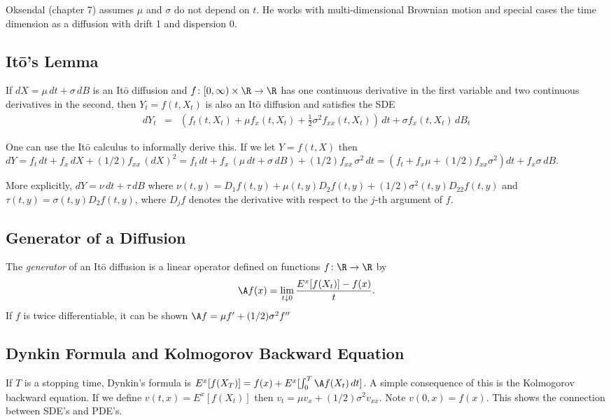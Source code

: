Oksendal (chapter 7) assumes $\mu$ and $\sigma$ do not depend on $t$.
He works with multi-dimensional Brownian motion and special
cases the time dimension as a diffusion with drift 1 and
dispersion 0.

\subsection{It\=o's Lemma}
If $dX = \mu\,dt + \sigma\,dB$ is an It\=o diffusion and
$f\colon [0,\infty)\times\R\to\R$ has one continuous
derivative in the first variable and two continuous derivatives
in the second, then
$Y_t = f(t, X_t)$ is also an It\=o diffusion and
satisfies the SDE
\begin{eqnarray*}
dY_t &=& 
	(f_t(t, X_t) + \mu f_x(t, X_t) + \frac{1}{2}\sigma^2 f_{xx}(t, X_t))\,dt + \sigma f_x(t, X_t)\,dB_t
\end{eqnarray*}

One can use the It\=o calculus to informally derive this.  If we let $Y =
f(t, X)$ then $dY = f_t\,dt +  f_x\,dX + (1/2)f_{xx}\,(dX)^2
= f_t\,dt +  f_x\,(\mu\,dt + \sigma\,dB) + (1/2)f_{xx}\,\sigma^2\,dt
= (f_t + f_x\mu + (1/2)f_{xx}\sigma^2)dt + f_x\sigma\,dB$.

More explicitly, $dY = \nu\,dt + \tau\,dB$ where
$\nu(t, y) = D_1f(t, y) + \mu(t, y)D_2f(t, y)
+ (1/2)\sigma^2(t, y)D_{22}f(t,y)$
and $\tau(t, y) = \sigma(t, y)D_2 f(t, y)$, where $D_jf$ denotes
the derivative with respect to the $j$-th argument of $f$.

\subsection{Generator of a Diffusion}
The {\em generator} of an It\=o diffusion is a linear operator
defined on functions $f\colon\R\to\R$ by
\begin{equation*}
\A f(x) = \lim_{t\downarrow 0}\frac{E^x[f(X_t)] - f(x)}{t}.
\end{equation*}
If $f$ is twice differentiable, it can be shown
$\A f = \mu f' + (1/2)\sigma^2 f''$

\subsection{Dynkin Formula and Kolmogorov Backward Equation}
If $T$ is a stopping time, Dynkin's formula is
$E^x[f(X_T)] = f(x) + E^x[\int_0^T\A
f(X_t)\,dt]$.  A simple consequence of this is the Kolmogorov
backward equation. If we define $v(t, x)
= E^x[f(X_t)]$ then $v_t = \mu v_x + (1/2)\sigma^2 v_{xx}$. Note $v(0,
x) = f(x)$. This shows the connection between SDE's
and PDE's.


